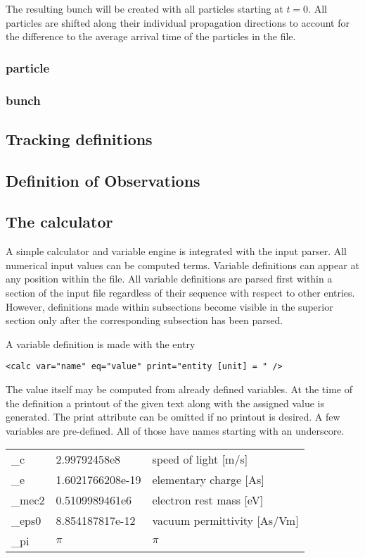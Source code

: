 \documentclass[11pt]{article}
\begin{document}
The resulting bunch will be created with all particles starting at $t=0$.
All particles are shifted along their individual propagation directions
to account for the difference to the average arrival time of the particles in the file.

\subsubsection{particle}

\subsubsection{bunch}

\subsection{Tracking definitions}


\subsection{Definition of Observations}


\subsection{The calculator}

A simple calculator and variable engine is integrated with
the input parser. All numerical input values can be computed terms.
Variable definitions can appear at any position within the file.
All variable definitions are parsed first within a section of the input file
regardless of their sequence with respect to other entries.
However, definitions made within subsections become visible in
the superior section only after the corresponding subsection has been parsed.

A variable definition is made with the entry
\begin{lstlisting}
<calc var="name" eq="value" print="entity [unit] = " />
\end{lstlisting}
The value itself may be computed from already defined variables.
At the time of the definition a printout of the given text along with the
assigned value is generated. The print attribute can be omitted if no printout is desired.
A few variables are pre-defined. All of those have names starting with an underscore.
\\[1ex]
\begin{tabular}{lll}
\_c & 2.99792458e8 & speed of light [m/s] \\
\_e & 1.6021766208e-19 & elementary charge [As] \\
\_mec2 & 0.5109989461e6 & electron rest mass [eV] \\
\_eps0 & 8.854187817e-12 & vacuum permittivity [As/Vm] \\
\_pi & $\pi$ & $\pi$ \\
\end{tabular}
\end{document}
